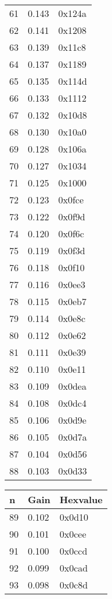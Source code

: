 \begin{table}[H]
\begin{subtable}[t]{0.30\linewidth}
\begin{tabular}{lll}
61 & 0.143 & 0x124a \\ 
62 & 0.141 & 0x1208 \\ 
63 & 0.139 & 0x11c8 \\ 
64 & 0.137 & 0x1189 \\ 
65 & 0.135 & 0x114d \\ 
66 & 0.133 & 0x1112 \\ 
67 & 0.132 & 0x10d8 \\ 
68 & 0.130 & 0x10a0 \\ 
69 & 0.128 & 0x106a \\ 
70 & 0.127 & 0x1034 \\ 
71 & 0.125 & 0x1000 \\ 
72 & 0.123 & 0x0fce \\ 
73 & 0.122 & 0x0f9d \\ 
74 & 0.120 & 0x0f6c \\ 
75 & 0.119 & 0x0f3d \\ 
76 & 0.118 & 0x0f10 \\ 
77 & 0.116 & 0x0ee3 \\ 
78 & 0.115 & 0x0eb7 \\ 
79 & 0.114 & 0x0e8c \\ 
80 & 0.112 & 0x0e62 \\ 
81 & 0.111 & 0x0e39 \\ 
82 & 0.110 & 0x0e11 \\ 
83 & 0.109 & 0x0dea \\ 
84 & 0.108 & 0x0dc4 \\ 
85 & 0.106 & 0x0d9e \\ 
86 & 0.105 & 0x0d7a \\ 
87 & 0.104 & 0x0d56 \\ 
88 & 0.103 & 0x0d33 \\ 
  \bottomrule
\end{tabular}
\end{subtable}\hfill
\vspace{0.7cm}
\begin{subtable}[t]{0.30\linewidth}
\centering
\vspace{0pt}
\begin{tabular}{lll}
  \toprule
n & Gain & Hexvalue \\
  \midrule
89 & 0.102 & 0x0d10 \\ 
90 & 0.101 & 0x0cee \\ 
91 & 0.100 & 0x0ccd \\ 
92 & 0.099 & 0x0cad \\ 
93 & 0.098 & 0x0c8d \\ 

\end{tabular}
\end{subtable}
\end{table}
